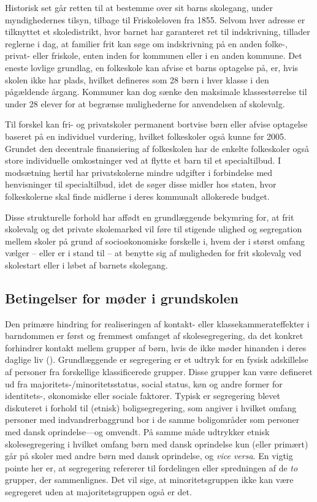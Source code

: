 \documentclass[
]{book}
\begin{document}
Historisk set går retten til at bestemme over sit barns skolegang, under myndighedernes tilsyn, tilbage til Friskoleloven fra 1855. Selvom hver adresse er tilknyttet et skoledistrikt, hvor barnet har garanteret ret til indskrivning, tillader reglerne i dag, at familier frit kan søge om indskrivning på en anden folke-, privat- eller friskole, enten inden for kommunen eller i en anden kommune. Det eneste lovlige grundlag, en folkeskole kan afvise et barns optagelse på, er, hvis skolen ikke har plads, hvilket defineres som 28 børn i hver klasse i den pågældende årgang. Kommuner kan dog sænke den maksimale klassestørrelse til under 28 elever for at begrænse mulighederne for anvendelsen af skolevalg.

Til forskel kan fri- og privatskoler permanent bortvise børn eller afvise optagelse baseret på en individuel vurdering, hvilket folkeskoler også kunne før 2005. Grundet den decentrale finansiering af folkeskolen har de enkelte folkeskoler også store individuelle omkostninger ved at flytte et barn til et specialtilbud. I modsætning hertil har privatskolerne mindre udgifter i forbindelse med henvisninger til specialtilbud, idet de søger disse midler hos staten, hvor folkeskolerne skal finde midlerne i deres kommunalt allokerede budget.

Disse strukturelle forhold har affødt en grundlæggende bekymring for, at frit skolevalg og det private skolemarked vil føre til stigende ulighed og segregation mellem skoler på grund af socioøkonomiske forskelle i, hvem der i størst omfang vælger -- eller er i stand til -- at benytte sig af muligheden for frit skolevalg ved skolestart eller i løbet af barnets skolegang.

\subsection{Betingelser for møder i grundskolen}\label{betingelser-for-muxf8der-i-grundskolen}

Den primære hindring for realiseringen af kontakt- eller klassekammerateffekter i barndommen er først og fremmest omfanget af skolesegregering, da det konkret forhindrer kontakt mellem grupper af børn, hvis de ikke møder hinanden i deres daglige liv (). Grundlæggende er segregering er et udtryk for en fysisk adskillelse af personer fra forskellige klassificerede grupper. Disse grupper kan være defineret ud fra majoritets-/minoritetsstatus, social status, køn og andre former for identitets-, økonomiske eller sociale faktorer. Typisk er segregering blevet diskuteret i forhold til (etnisk) boligsegregering, som angiver i hvilket omfang personer med indvandrerbaggrund bor i de samme boligområder som personer med dansk oprindelse---og omvendt. På samme måde udtrykker etnisk skolesegregering i hvilket omfang børn med dansk oprindelse kun (eller primært) går på skoler med andre børn med dansk oprindelse, og \emph{vice versa}. En vigtig pointe her er, at segregering refererer til fordelingen eller spredningen af de \emph{to} grupper, der sammenlignes. Det vil sige, at minoritetsgruppen ikke kan være segregeret uden at majoritetsgruppen også er det.
\end{document}
